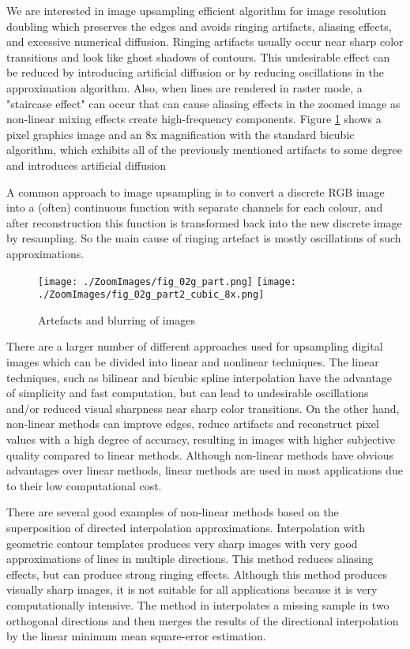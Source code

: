 We are interested in image upsampling efficient algorithm for image resolution doubling which preserves the edges and avoids ringing artifacts, aliasing effects, and excessive numerical diffusion. 
Ringing artifacts usually occur near sharp color transitions and look like ghost shadows of contours. 
This undesirable effect can be reduced by introducing artificial diffusion or by reducing oscillations in the approximation algorithm. 
Also, when lines are rendered in raster mode, a "staircase effect" can occur that can cause aliasing effects in the zoomed image as non-linear mixing effects create high-frequency components. 
Figure \ref{figshadow} shows a pixel graphics image and an 8x magnification with the standard bicubic algorithm, which exhibits all of the previously mentioned artifacts to some degree and introduces artificial diffusion

A common approach to image upsampling is to convert a discrete RGB image into a (often) continuous function with separate channels for each colour, and after reconstruction this function is transformed back into the new discrete image by resampling. So the main cause of ringing artefact is mostly oscillations of such approximations.	
	\begin{figure}
		\centering
		\texttt{[image: ./ZoomImages/fig\_02g\_part.png]}
		\texttt{[image: ./ZoomImages/fig\_02g\_part2\_cubic\_8x.png]}
		\caption{Artefacts and blurring of images}
		\label{figshadow}
	\end{figure}
There are a larger number of different approaches used for upsampling digital images \cite{Hou,Keys,Getreuer2011,Youngjoon2014,HakranKim2011} which can be divided into linear and nonlinear techniques.
The linear techniques, such as bilinear and bicubic spline interpolation \cite{Hou,Keys} have the advantage of simplicity and fast computation, but can lead to undesirable oscillations and/or reduced visual sharpness near sharp color transitions. On the other hand, non-linear methods can improve edges,
reduce artifacts and reconstruct pixel values with a high degree of accuracy, resulting in images with
higher subjective quality compared to linear methods. Although non-linear methods have obvious advantages over linear methods,
linear methods are used in most applications due to their low computational cost.

There are several good examples of non-linear methods based on the superposition of directed interpolation approximations.
Interpolation with geometric contour templates \cite{getreuergeomcontstenc} produces very sharp images with very good approximations of lines in multiple directions. This method reduces aliasing effects, but can produce strong ringing effects. Although this method produces visually sharp images, it is not suitable for all applications because it is very computationally intensive. The method in \cite{Lei2006} interpolates a missing sample in two orthogonal directions and then merges the results of the directional interpolation by the linear minimum mean square-error estimation.

